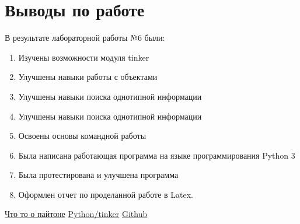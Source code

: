 \documentclass[a4paper,14pt]{extarticle}
\begin{document}
\newpage\section*{Выводы по работе}
В результате лабораторной работы №6 были: 
\begin{enumerate}
 \item Изучены возможности модуля tinker
 \item Улучшены навыки работы с объектами
 \item Улучшены навыки поиска однотипной информации
  \item Улучшены навыки поиска однотипной информации
 \item Освоены основы командной работы
 \item Была написана работающая программа на языке программирования Python 3
 \item Была протестирована и улучшена программа
  \item Оформлен отчет по проделанной работе в Latex.
\end{enumerate}

\newpage{}
\renewcommand\bibname{Список литературы}
\begin{thebibliography}{99}
 \href{https://habr.com/ru/post/31180/}{Что то о пайтоне}
 \href{https://python-scripts.com/tkinter-introduction}{Python/tinker}
 \href{https://github.com/features}{Github}

\end{thebibliography}
\end{document}
